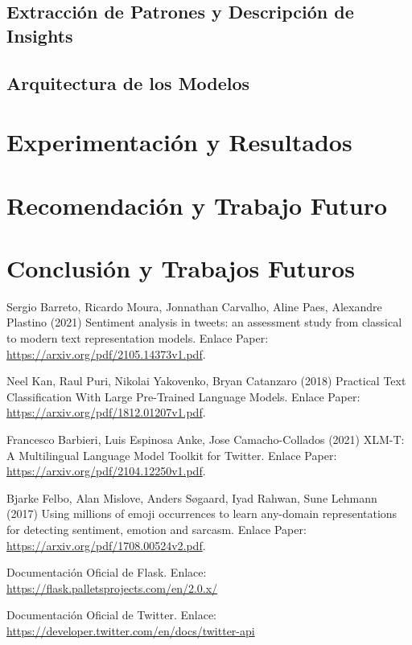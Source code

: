 \documentclass[a4paper,12pt]{article}
\theoremstyle{definition}
\theoremstyle{remark}
\begin{document}
\subsection{Extracción de Patrones y Descripción de Insights}



\subsection{Arquitectura de los Modelos}



\section{Experimentación y Resultados}

\section{Recomendación y Trabajo Futuro}

\section{Conclusión y Trabajos Futuros}

\begin{thebibliography}{00}
 Sergio Barreto, Ricardo Moura, Jonnathan Carvalho, Aline Paes, Alexandre Plastino (2021) Sentiment analysis in tweets: an assessment study from classical to modern text representation models. Enlace Paper: \href{https://arxiv.org/pdf/2105.14373v1.pdf}{https://arxiv.org/pdf/2105.14373v1.pdf}.

 Neel Kan, Raul Puri, Nikolai Yakovenko, Bryan Catanzaro (2018) Practical Text Classification With Large Pre-Trained Language Models. Enlace Paper: \href{https://arxiv.org/pdf/1812.01207v1.pdf}{https://arxiv.org/pdf/1812.01207v1.pdf}.

 Francesco Barbieri, Luis Espinosa Anke,  Jose Camacho-Collados (2021) XLM-T: A Multilingual Language Model Toolkit for Twitter. Enlace Paper: \href{https://arxiv.org/pdf/2104.12250v1.pdf}{https://arxiv.org/pdf/2104.12250v1.pdf}.

 Bjarke Felbo, Alan Mislove,  Anders Søgaard, Iyad Rahwan, Sune Lehmann (2017) Using millions of emoji occurrences to learn any-domain representations for detecting sentiment, emotion and sarcasm. Enlace Paper: \href{https://arxiv.org/pdf/1708.00524v2.pdf}{https://arxiv.org/pdf/1708.00524v2.pdf}.

 Documentación Oficial de Flask. Enlace: \href{https://flask.palletsprojects.com/en/2.0.x/}{https://flask.palletsprojects.com/en/2.0.x/}

 Documentación Oficial de Twitter. Enlace: \href{https://developer.twitter.com/en/docs/twitter-api}{https://developer.twitter.com/en/docs/twitter-api}

\end{thebibliography}
\end{document}
